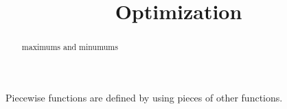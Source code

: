 \documentclass{ximera}
\title{Optimization}
\begin{document}
\begin{abstract}
maximums and minumums
\end{abstract}
\maketitle



Piecewise functions are defined by using pieces of other functions.
\end{document}
